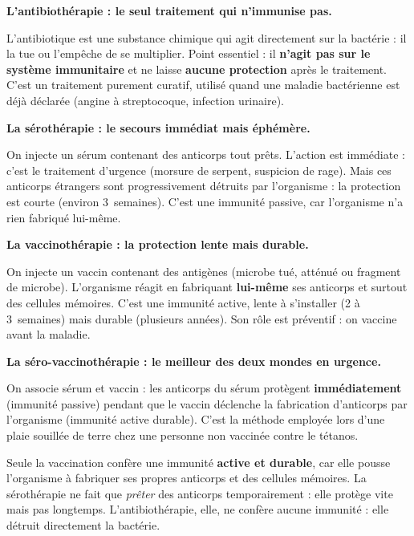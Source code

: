 \documentclass[11pt]{article}
\newcommand{\cle}[1]{{\popxbold\color{popdark}#1}}
\newcounter{popsec}
\newcounter{popsub}
\newcommand{\courssub}[1]{%
  \stepcounter{popsub}%
  \par\vspace{9pt}\noindent{\popxbold\fontsize{11.5}{13}\selectfont\color{popink}{\color{poporange}\thepopsec.\thepopsub}\hspace{6pt}#1}\par\nopagebreak\vspace{4pt}
}
\begin{document}
\courssub{Ce qu'il faut retenir de chaque méthode}

\textbf{L'antibiothérapie : le seul traitement qui n'immunise pas.}\par
L'antibiotique est une \cle{substance chimique} qui agit directement sur la \cle{bactérie} : il la tue ou l'empêche de se multiplier. Point essentiel : il \textbf{n'agit pas sur le système immunitaire} et ne laisse \textbf{aucune protection} après le traitement. C'est un traitement purement \cle{curatif}, utilisé quand une maladie bactérienne est déjà déclarée (angine à streptocoque, infection urinaire).

\textbf{La sérothérapie : le secours immédiat mais éphémère.}\par
On injecte un sérum contenant des \cle{anticorps} tout prêts. L'action est \cle{immédiate} : c'est le traitement d'\cle{urgence} (morsure de serpent, suspicion de rage). Mais ces anticorps étrangers sont progressivement détruits par l'organisme : la protection est \cle{courte} (environ 3~semaines). C'est une immunité \cle{passive}, car l'organisme n'a rien fabriqué lui-même.

\textbf{La vaccinothérapie : la protection lente mais durable.}\par
On injecte un vaccin contenant des \cle{antigènes} (microbe tué, atténué ou fragment de microbe). L'organisme réagit en fabriquant \textbf{lui-même} ses anticorps et surtout des \cle{cellules mémoires}. C'est une immunité \cle{active}, lente à s'installer (2 à 3~semaines) mais \cle{durable} (plusieurs années). Son rôle est \cle{préventif} : on vaccine avant la maladie.

\textbf{La séro-vaccinothérapie : le meilleur des deux mondes en urgence.}\par
On associe sérum et vaccin : les anticorps du sérum protègent \textbf{immédiatement} (immunité passive) pendant que le vaccin déclenche la fabrication d'anticorps par l'organisme (immunité active durable). C'est la méthode employée lors d'une plaie souillée de terre chez une personne non vaccinée contre le tétanos.

\begin{propriete}
Seule la \cle{vaccination} confère une immunité \textbf{active et durable}, car elle pousse l'organisme à fabriquer ses propres anticorps et des cellules mémoires. La \cle{sérothérapie} ne fait que \emph{prêter} des anticorps temporairement : elle protège vite mais pas longtemps. L'\cle{antibiothérapie}, elle, ne confère aucune immunité : elle détruit directement la bactérie.
\end{propriete}
\end{document}
